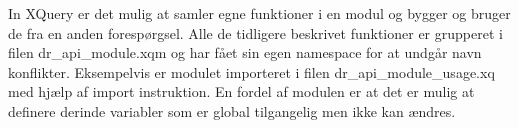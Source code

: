 In XQuery er det mulig at samler egne funktioner i en modul og bygger og bruger de fra en anden forespørgsel. Alle de tidligere beskrivet funktioner er grupperet i filen dr\_api\_module.xqm og har fået sin egen namespace for at undgår navn konflikter. Eksempelvis er modulet importeret i filen dr\_api\_module\_usage.xq med hjælp af import instruktion. En fordel af modulen er at det er mulig at definere derinde variabler som er global tilgangelig men ikke kan ændres. 

